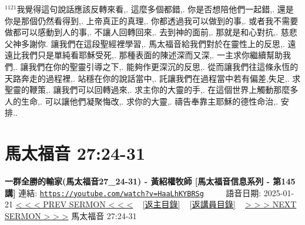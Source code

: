 \documentclass{book}
\begin{document}
$^{1121}$我覺得這句說話應該反轉來看,.
這麼多個都錯,.
你是否想陪他們一起錯,.
還是你是那個仍然看得到,.
上帝真正的真理,.
你都透過我可以做到的事,.
或者我不需要做都可以感動到人的事,.
不讓人回轉回來,.
去到神的面前,.
那就是和心對抗,.
慈悲父神多謝你.
讓我們在這段聖經裡學習,.
馬太福音給我們對於在靈性上的反思,.
遠遠比我們只是單純看耶穌受死,.
那種表面的陳述深而又深,.
一主求你繼續幫助我們,.
讓我們在你的聖靈引導之下,.
能夠作更深沉的反思,.
從而讓我們往這條永恆的天路奔走的過程裡,.
站穩在你的說話當中,.
託讓我們在過程當中若有偏差,失足,.
求聖靈的鞭策,.
讓我們可以回轉過來,.
求主你的大靈的手,.
在這個世界上觸動那麼多人的生命,.
可以讓他們凝聚悔改,.
求你的大靈,.
禱告奉靠主耶穌的德性命治,.
安排..
\newpage



\section{馬太福音 27:24-31}
\label{sec:HaaLhKYBRSg}
\textbf{一群全勝的輸家(馬太福音27\_24-31) - 黃紹權牧師  [馬太福音信息系列 - 第145講]}
\newline
\newline
連結: \href{https://youtube.com/watch?v=HaaLhKYBRSg}{\texttt{https://youtube.com/watch?v=HaaLhKYBRSg}} ~~~~ 語音日期: 2025-01-21
\newline
\newline
\hyperref[sec:ZN4O4BAmHMA]{< < < PREV SERMON < < <}
~
\hyperlink{toc}{[返主目錄]}
~
\hyperref[ch:preacher16]{[返講員目錄]}
~
\hyperref[sec:oCpi7n8ictU]{> > > NEXT SERMON > > >}
\newline
\newline
馬太福音 27:24-31
\newline
\end{document}
